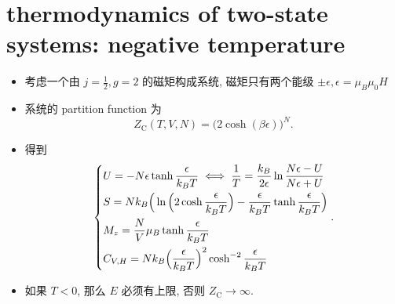 \section{thermodynamics of two-state systems: negative temperature}
\begin{itemize}
	\item 考虑一个由 $j = \frac{1}{2}, g = 2$ 的磁矩构成系统, 磁矩只有两个能级 $\pm \epsilon, \epsilon = \mu_B \mu_0 H$
	
	\item 系统的 partition function 为
	\begin{equation}
		Z_\text{C}(T, V, N) = \Big( 2 \cosh(\beta \epsilon) \Big)^N.
	\end{equation}
	
	\item 得到
	\begin{equation}
		\begin{dcases}
			U = - N \epsilon \tanh \frac{\epsilon}{k_B T} \iff \frac{1}{T} = \frac{k_B}{2 \epsilon} \ln \frac{N \epsilon - U}{N \epsilon + U} \\
			S = N k_B \Big( \ln \Big( 2 \cosh \frac{\epsilon}{k_B T} \Big) - \frac{\epsilon}{k_B T} \tanh \frac{\epsilon}{k_B T} \Big) \\
			M_z = \frac{N}{V} \mu_B \tanh \frac{\epsilon}{k_B T} \\
			C_{V, H} = N k_B \Big( \frac{\epsilon}{k_B T} \Big)^2 \cosh^{- 2} \frac{\epsilon}{k_B T}
		\end{dcases}.
	\end{equation}
	
	\item 如果 $T < 0$, 那么 $E$ 必须有上限, 否则 $Z_\text{C} \rightarrow \infty$.
\end{itemize}

